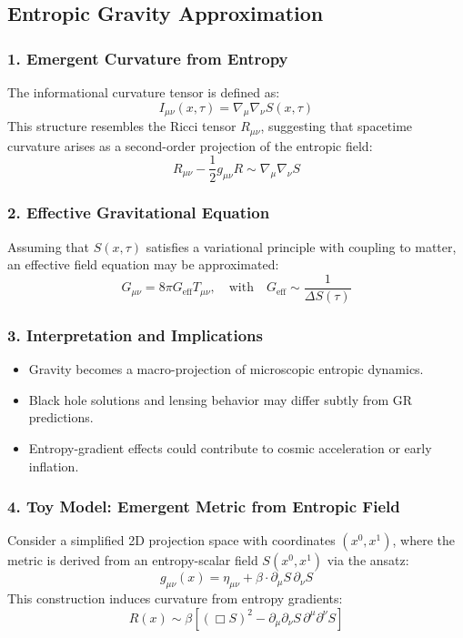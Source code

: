 \documentclass[10.5pt,a4paper]{article}
\begin{document}
\subsection{Entropic Gravity Approximation}

\subsubsection*{1. Emergent Curvature from Entropy}
The informational curvature tensor is defined as:
\[
I_{\mu\nu}(x, \tau) = \nabla_\mu \nabla_\nu S(x, \tau)
\]
This structure resembles the Ricci tensor \( R_{\mu\nu} \), suggesting that spacetime curvature arises as a second-order projection
of the entropic field:
\[
R_{\mu\nu} - \frac{1}{2}g_{\mu\nu}R \sim \nabla_\mu \nabla_\nu S
\]

\subsubsection*{2. Effective Gravitational Equation}
Assuming that \( S(x, \tau) \) satisfies a variational principle with coupling to matter, an effective field equation may be approximated:
\[
G_{\mu\nu} = 8\pi G_{\text{eff}} T_{\mu\nu}, \quad \text{with} \quad G_{\text{eff}} \sim \frac{1}{\Delta S(\tau)}
\]

\subsubsection*{3. Interpretation and Implications}
\begin{itemize}
    \item Gravity becomes a macro-projection of microscopic entropic dynamics.
    \item Black hole solutions and lensing behavior may differ subtly from GR predictions.
    \item Entropy-gradient effects could contribute to cosmic acceleration or early inflation.
\end{itemize}

\subsubsection*{4. Toy Model: Emergent Metric from Entropic Field}
Consider a simplified 2D projection space with coordinates \( (x^0, x^1) \), where the metric is derived from an entropy-scalar field \( S(x^0, x^1) \)
via the ansatz:
\[
g_{\mu\nu}(x) = \eta_{\mu\nu} + \beta \cdot \partial_\mu S \, \partial_\nu S
\]
This construction induces curvature from entropy gradients:
\[
R(x) \sim \beta \left[ (\Box S)^2 - \partial_\mu \partial_\nu S \, \partial^\mu \partial^\nu S \right]
\]
\end{document}
